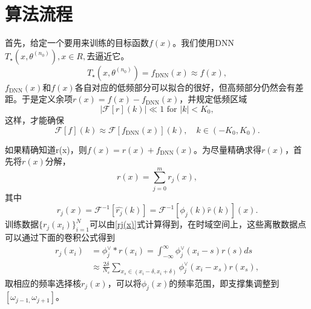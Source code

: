 \section{算法流程}
首先，给定一个要用来训练的目标函数$f(x)$。我们使用DNN$T_{\star}(x,\theta^{(n_{0}%
)}),x\in R,$去逼近它。
\begin{equation}
T_{\star}(x,\theta^{(n_{0})})=f_{\text{DNN}}(x)\approx f(x),\label{f1(x)}%
\end{equation}
$f_{\text{DNN}}(x)$和$f(x)$各自对应的低频部分可以拟合的很好，但高频部分仍然会有差距。于是定义余项$r(x)=f(x)-f_{\text{DNN}}(x)$，并规定低频区域
\begin{equation}
\left\vert \mathcal{F}[r](k)\right\vert \ll1\text{ for }\left\vert
k\right\vert <K_{0},
\end{equation}
这样，才能确保
\begin{equation}
\mathcal{F}[f](k)\approx\mathcal{F}[f_{\text{DNN}}(x)](k),\quad k\in
(-K_{0},K_{0}).\label{eq:1psdnn}%
\end{equation}

如果精确知道r(x)，则$f(x) = r(x) + f_{\text{DNN}}(x)$。为尽量精确求得$r(x)$，首先将$r(x)$分解，
\begin{equation}
r(x)=%
{\displaystyle\sum\limits_{j=0}^{m}}
r_{j}(x),
\end{equation}
其中
\begin{equation}
r_{j}(x)=\mathcal{F}^{-1}[\widehat{r_{j}}(k)]=\mathcal{F}^{-1}[\phi
_{j}(k)\widehat{r}(k)](x).\label{rj(x)}%
\end{equation}
训练数据$\{r_{j}(x_{i})\}_{i=1}^{N}$可以由\ref{rj(x)}式计算得到，在时域空间上，这些离散数据点可以通过下面的卷积公式得到
\begin{align}
r_{j}(x_{i}) &  =\phi_{j}^{\vee}\ast r(x_{i})=\int_{-\infty}^{\infty}\phi
_{j}^{\vee}(x_{i}-s)r(s)ds\nonumber\\
&  \approx\frac{2\delta}{N_{s}}%
{\displaystyle\sum\limits_{x_{s}\in(x_{i}-\delta,x_{i}+\delta)}}
\phi_{j}^{\vee}(x_{i}-x_{s})r(x_{s}),\label{convol}%
\end{align}
取相应的频率选择核$r_{j}(x)$，可以将$\phi_j(x)$的频率范围，即支撑集调整到$[\omega_{j-1,}\omega_{j+1}]$。


